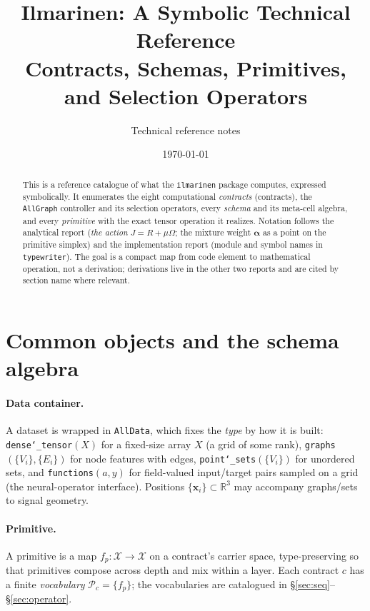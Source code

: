 \documentclass[11pt]{article}
\title{\bf Ilmarinen: A Symbolic Technical Reference\\[4pt]
\large Contracts, Schemas, Primitives, and Selection Operators}
\author{Technical reference notes}
\date{\today}
\newcommand{\allowbreakhere}{\discretionary{}{}{}}
\newcommand{\code}[1]{\texttt{\def\_{\char`_\allowbreakhere}#1}}
\newcommand{\R}{\mathbb{R}}
\newcommand{\Pcal}{\mathcal{P}}
\newcommand{\alphapar}{\bm{\alpha}}
\begin{document}
\maketitle

\begin{abstract}
This is a reference catalogue of what the \code{ilmarinen} package computes, expressed symbolically. It
enumerates the eight computational \emph{contracts} (contracts), the \code{AllGraph} controller and its
selection operators, every \emph{schema} and its meta-cell algebra, and every \emph{primitive} with
the exact tensor operation it realizes. Notation follows the analytical report (\emph{the action}
$J=R+\mu\Omega$; the mixture weight $\alphapar$ as a point on the primitive simplex) and the
implementation report (module and symbol names in \code{typewriter}). The goal is a compact map from
code element to mathematical operation, not a derivation; derivations live in the other two reports and
are cited by section name where relevant.
\end{abstract}

\tableofcontents

\section{Common objects and the schema algebra}
\label{sec:algebra}

\paragraph{Data container.} A dataset is wrapped in \code{AllData}, which fixes the \emph{type} by how it
is built: \code{dense\_tensor}$(X)$ for a fixed-size array $X$ (a grid of some rank), \code{graphs}$(\{V_i\},\{E_i\})$
for node features with edges, \code{point\_sets}$(\{V_i\})$ for unordered sets, and \code{functions}$(a,y)$
for field-valued input/target pairs sampled on a grid (the neural-operator interface). Positions
$\{\bm{x}_i\}\subset\R^3$ may accompany graphs/sets to signal geometry.

\paragraph{Primitive.} A primitive is a map $f_p:\mathcal{X}\to\mathcal{X}$ on a contract's carrier space,
type-preserving so that primitives compose across depth and mix within a layer. Each contract $c$ has a
finite \emph{vocabulary} $\Pcal_c=\{f_p\}$; the vocabularies are catalogued in \S\ref{sec:seq}--\S\ref{sec:operator}.
\end{document}
